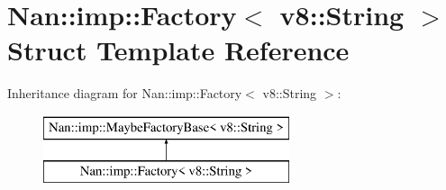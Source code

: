 \hypertarget{struct_nan_1_1imp_1_1_factory_3_01v8_1_1_string_01_4}{}\section{Nan\+:\+:imp\+:\+:Factory$<$ v8\+:\+:String $>$ Struct Template Reference}
\label{struct_nan_1_1imp_1_1_factory_3_01v8_1_1_string_01_4}
Inheritance diagram for Nan\+:\+:imp\+:\+:Factory$<$ v8\+:\+:String $>$\+:\begin{figure}[H]
\begin{center}
\leavevmode
\includegraphics[height=2.000000cm]{struct_nan_1_1imp_1_1_factory_3_01v8_1_1_string_01_4}
\end{center}
\end{figure}
